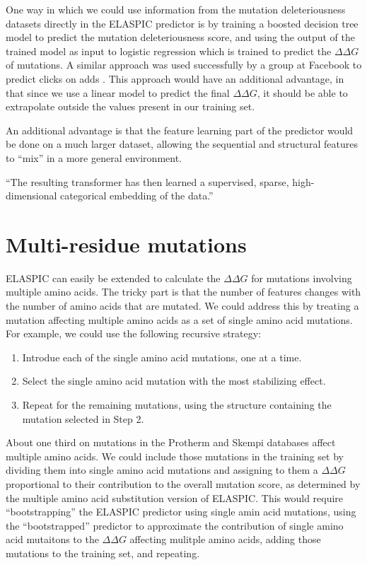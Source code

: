 One way in which we could use information from the mutation deleteriousness datasets directly in the ELASPIC predictor is by training a boosted decision tree model to predict the mutation deleteriousness score, and using the output of the trained model as input to logistic regression which is trained to predict the $\Delta \Delta G$ of mutations. A similar approach was used successfully by a group at Facebook to predict clicks on adds \cite{he_practical_2014}. This approach would have an additional advantage, in that since we use a linear model to predict the final $\Delta \Delta G$, it should be able to extrapolate outside the values present in our training set.

An additional advantage is that the feature learning part of the predictor would be done on a much larger dataset, allowing the sequential and structural features to ``mix'' in a more general environment.

``The resulting transformer has then learned a supervised, sparse, high-dimensional categorical embedding of the data.''




\section{Multi-residue mutations}

ELASPIC can easily be extended to calculate the $\Delta \Delta G$ for mutations involving multiple amino acids. The tricky part is that the number of features changes with the number of amino acids that are mutated. We could address this by treating a mutation affecting multiple amino acids as a set of single amino acid mutations. For example, we could use the following recursive strategy:

\begin{enumerate}
    \item Introdue each of the single amino acid mutations, one at a time.
    \item Select the single amino acid mutation with the most stabilizing effect.
    \item Repeat for the remaining mutations, using the structure containing the mutation selected in Step 2.
\end{enumerate}

About one third on mutations in the Protherm and Skempi databases affect multiple amino acids. We could include those mutations in the training set by dividing them into single amino acid mutations and assigning to them a $\Delta \Delta G$ proportional to their contribution to the overall mutation score, as determined by the multiple amino acid substitution version of ELASPIC. This would require ``bootstrapping'' the ELASPIC predictor using single amin acid mutations, using the ``bootstrapped'' predictor to approximate the contribution of single amino acid mutaitons to the $\Delta \Delta G$ affecting mulitple amino acids, adding those mutations to the training set, and repeating.

